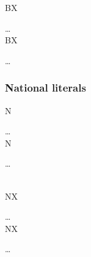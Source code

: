 \begin{syntax}
  \begin{1=}
    BX\textquotesingle
    \begin{0-1}
      \hexcharacter
    \end{0-1}\ldots
    \textquotesingle \\
    
    BX\textquotedbl
    \begin{0-1}
      \hexcharacter
    \end{0-1}\ldots
    \textquotedbl
  \end{1=}
\end{syntax}

\subsubsection{National literals}

\begin{syntax}
  \begin{1=}
    N\textquotesingle
    \begin{0-1}
      \character
    \end{0-1}\ldots
    \textquotesingle \\
    
    N\textquotedbl
    \begin{0-1}
      \character
    \end{0-1}\ldots
    \textquotedbl \\

    \\

  \end{1=}
\end{syntax}

\begin{syntax}
  \begin{1=}
    NX\textquotesingle
    \begin{0-1}
      \hexcharacter
    \end{0-1}\ldots
    \textquotesingle \\
    
    NX\textquotedbl
    \begin{0-1}
      \hexcharacter
    \end{0-1}\ldots
    \textquotedbl
  \end{1=}  
\end{syntax}

